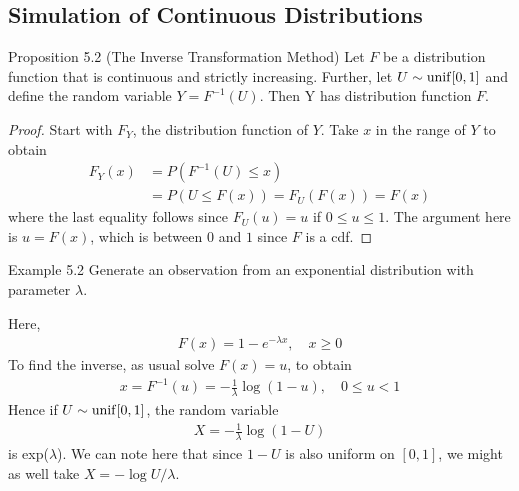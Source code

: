 \subsection{Simulation of Continuous Distributions}
\begin{boks}{Proposition 5.2 (The Inverse Transformation Method)}
  Let $F$ be a distribution function that is continuous and strictly increasing. Further, let $U \sim \operatorname{unif}[0,1]$ and define the random variable $Y = F^{-1}(U)$. Then Y has distribution function $F$.
\end{boks}
\begin{proof}
  Start with $F_Y$, the distribution function of $Y$. Take $x$ in the range of $Y$ to obtain
  \begin{align*}
    F_Y(x) &= P(F^{-1}(U) \leq x) \\
    &= P(U \leq F(x)) = F_U(F(x)) = F(x)
  \end{align*}
  where the last equality follows since $F_U(u) = u$ if $0 \leq u \leq 1$. The argument here is $u = F(x)$, which is between $0$ and $1$ since $F$ is a cdf.
\end{proof}

\begin{boks}{Example 5.2}
  Generate an observation from an exponential distribution with parameter $\lambda$.

  Here,
  \begin{align*}
    F(x) = 1- e^{-\lambda x}, \quad x \geq 0
  \end{align*}
  To find the inverse, as usual solve $F(x) = u$, to obtain
  \begin{align*}
    x = F^{-1}(u) = -\frac{1}{\lambda} \log(1 - u), \quad 0 \leq u < 1
  \end{align*}
  Hence if $U \sim \operatorname{unif}[0,1]$, the random variable
  \begin{align*}
  X = -\frac{1}{\lambda} \log(1 - U)
  \end{align*}
  is exp($\lambda$). We can note here that since $1 - U$ is also uniform on $[0,1]$, we might as well take $X = - \log U/\lambda$.
\end{boks}

